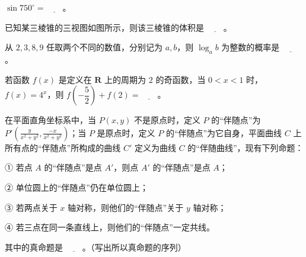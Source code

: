 \begin{question}
\(\sin 750^{\circ}=\underline{\qquad}\)。

\Needspace{0.4\textheight}
\end{question}
\begin{question}
已知某三棱锥的三视图如图所示，则该三棱锥的体积是 \(\underline{\qquad}\)。
\nopagebreak[4]
\begin{center}\end{center}
\nopagebreak[4]
\end{question}
\begin{question}
从 \(2,3,8,9\) 任取两个不同的数值，分别记为 \(a,b\)，则 \(\log_{a}b\) 为整数的概率是 \(\underline{\qquad}\)。

\end{question}
\begin{question}
若函数 \(f(x)\) 是定义在 \(\mathbf{R}\) 上的周期为 \(2\) 的奇函数，当 \(0<x<1\) 时，\(f(x)=4^{x}\)，则 \(f\left(-\dfrac{5}{2}\right)+f(2)=\underline{\qquad}\)。

\end{question}
\begin{question}
在平面直角坐标系中，当 \(P(x,y)\) 不是原点时，定义 \(P\) 的“伴随点”为 \(P'\left(\frac{y}{x^{2}+y^{2}},\frac{-x}{x^{2}+y^{2}}\right)\)；当 \(P\) 是原点时，定义 \(P\) 的“伴随点”为它自身，平面曲线 \(C\) 上所有点的“伴随点”所构成的曲线 \(C'\) 定义为曲线 \(C\) 的“伴随曲线”，现有下列命题：

① 若点 \(A\) 的“伴随点”是点 \(A'\)，则点 \(A'\) 的“伴随点”是点 \(A\)；

② 单位圆上的“伴随点”仍在单位圆上；

③ 若两点关于 \(x\) 轴对称，则他们的“伴随点”关于 \(y\) 轴对称；

④ 若三点在同一条直线上，则他们的“伴随点”一定共线。

其中的真命题是 \(\underline{\qquad}\)。（写出所以真命题的序列）

\end{question}


